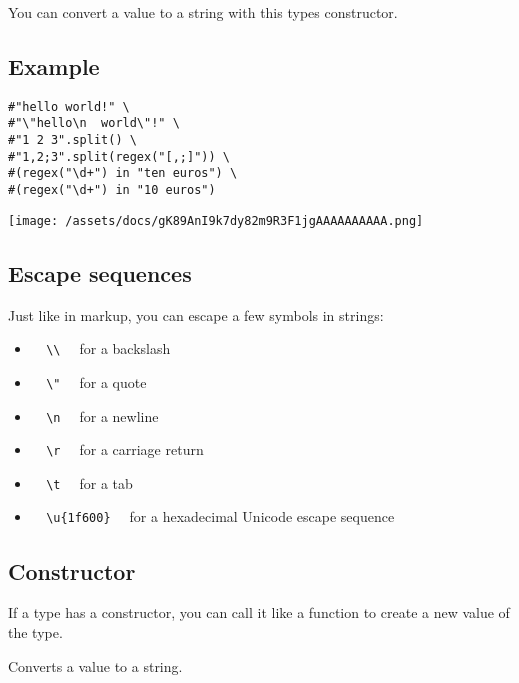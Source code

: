 You can convert a value to a string with this type\textquotesingle s
constructor.

\subsection{Example}\label{example}

\begin{verbatim}
#"hello world!" \
#"\"hello\n  world\"!" \
#"1 2 3".split() \
#"1,2;3".split(regex("[,;]")) \
#(regex("\d+") in "ten euros") \
#(regex("\d+") in "10 euros")
\end{verbatim}

\texttt{[image: /assets/docs/gK89AnI9k7dy82m9R3F1jgAAAAAAAAAA.png]}

\subsection{Escape sequences}\label{escapes}

Just like in markup, you can escape a few symbols in strings:

\begin{itemize}
\tightlist
\item
  \texttt{\ }{\texttt{\ \textbackslash{}\textbackslash{}\ }}\texttt{\ }
  for a backslash
\item
  \texttt{\ }{\texttt{\ \textbackslash{}"\ }}\texttt{\ } for a quote
\item
  \texttt{\ }{\texttt{\ \textbackslash{}n\ }}\texttt{\ } for a newline
\item
  \texttt{\ }{\texttt{\ \textbackslash{}r\ }}\texttt{\ } for a carriage
  return
\item
  \texttt{\ }{\texttt{\ \textbackslash{}t\ }}\texttt{\ } for a tab
\item
  \texttt{\ }{\texttt{\ \textbackslash{}u\{1f600\}\ }}\texttt{\ } for a
  hexadecimal Unicode escape sequence
\end{itemize}

\subsection{\texorpdfstring{Constructor
{}}{Constructor }}\label{constructor}

\label{constructor-constructor-tooltip}
If a type has a constructor, you can call it like a function to create a
new value of the type.

Converts a value to a string.

